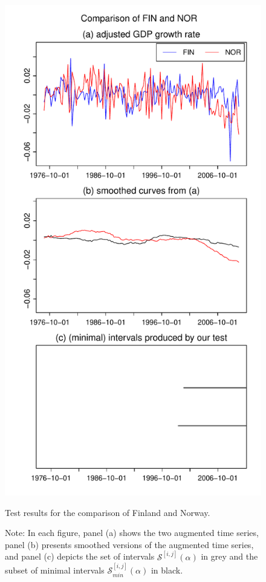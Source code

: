\documentclass[a4paper,12pt]{article}
\begin{document}
\begin{figure}[t!]
\begin{minipage}[t]{0.49\textwidth}
\includegraphics[width=\textwidth]{output/plots/gdp/FIN_vs_NOR}
\caption{Test results for the comparison of Finland and Norway.}\label{fig:Finland:Norway}
\end{minipage}
\caption*{Note: In each figure, panel (a) shows the two augmented time series, panel (b) presents smoothed versions of the augmented time series, and panel (c) depicts the set of intervals $\mathcal{S}^{[i, j]}(\alpha)$ in grey and the subset of minimal intervals $\mathcal{S}^{[i, j]}_{min}(\alpha)$ in black.}
\end{figure}
\end{document}

